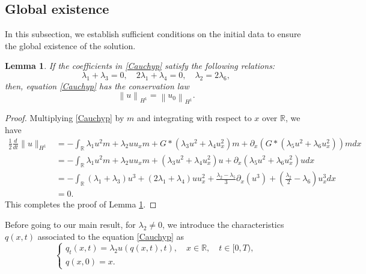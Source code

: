 \documentclass[11pt]{article}
\newtheorem{lemma}{Lemma}
\begin{document}
\subsection{Global existence}
In this subsection, we establish sufficient conditions on the initial data to ensure the global existence of the solution.
\begin{lemma}\label{CLH1}
If the coefficients in \eqref{Cauchyp} satisfy the following relations:
\begin{equation*}\label{constraintsforH1}
\lambda_1+\lambda_3=0,\quad 2\lambda_1+\lambda_4 =0,\quad \lambda_2 = 2\lambda_6,
\end{equation*}
then, equation \eqref{Cauchyp} has the conservation law
\begin{equation*}%
\left\| u\right\| _{H^1}=\left\| u_{0}\right\|_{H^1} .
\end{equation*}
\end{lemma}
\begin{proof}
Multiplying \eqref{Cauchyp} by $m$ and integrating with respect to $x$ over $\mathbb{R}$, we have
\begin{equation*}
    \begin{aligned}
 \frac{1}{2}\frac{d}{dt}\|u\|_{H^1} &=-\int_{\mathbb{R}}\lambda_1 u^2m + \lambda_2 u u_xm + G\ast(\lambda_3 u^2 + \lambda_4 u_x^2)m + \partial_x \left(  G \ast (\lambda_5 u^2 + \lambda_6 u_x^2)\right)m dx\\
 &=-\int_{\mathbb{R}}\lambda_1 u^2m + \lambda_2 u u_xm + (\lambda_3 u^2 + \lambda_4 u_x^2)u + \partial_x  (\lambda_5 u^2 + \lambda_6 u_x^2)u dx\\
 &=-\int_{\mathbb{R}}(\lambda_1+\lambda_3) u^3 + (2\lambda_1+\lambda_4) u u_x^2
 +\frac{\lambda_2-\lambda_5}{3}\partial_x(u^3) + \left(\frac{\lambda_2}{2}-\lambda_6\right)u_x^3dx\\
 &=0.
 \end{aligned}
\end{equation*}
This completes the proof of Lemma \ref{CLH1}.
\end{proof}
Before going to our main result, for $\lambda_2\neq0$, we introduce the characteristics $q(x,t)$ associated to the equation \eqref{Cauchyp} as
\begin{equation}\label{characteristics}
\left\{\begin{array}{l}
q_{t}(x,t)=\lambda_2u(q(x,t),t),\quad x \in {\mathbb{R}}, \quad t \in[0, T), \\
q(x,0)=x.
\end{array}\right.
\end{equation}
\end{document}
